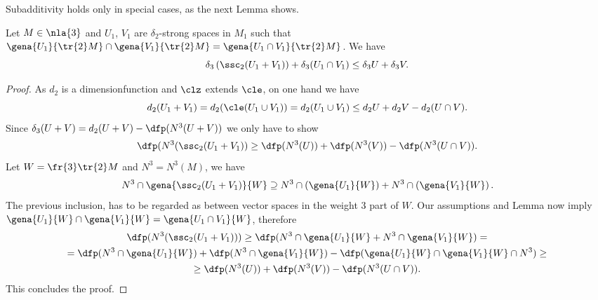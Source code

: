 Subadditivity holds only in special cases, as the next Lemma shows.
\begin{lem}\label{presubatre}
Let $M\in\nla{3}$ and $U_{1}$, $V_{1}$ are $\delta_{2}$-strong spaces in $M_{1}$ such that
$\gena{U_{1}}{\tr{2}M}\cap\gena{V_{1}}{\tr{2}M}=\gena{U_{1}\cap V_{1}}{\tr{2}M}$.
We have
$$\delta_3\left(\ssc_{2}(U_{1}+V_{1})\right)+\delta_{3}(U_{1}\cap V_{1})\leq\delta_{3}U+\delta_{3}V.$$
\end{lem}
\begin{proof}
As $d_{2}$ is a dimensionfunction and $\clz$ extends $\cle$, on one hand we have
$$d_{2}(U_{1}+V_{1})=d_{2}(\cle(U_{1}\cup V_{1}))=
d_{2}(U_{1}\cup V_{1})\leq
d_{2}U+d_{2}V-d_{2}(U\cap V).$$
Since $\delta_{3}(U+V)=d_{2}(U+V)-\dfp(N^{3}(U+V))$ we only have to show
$$\dfp(N^{3}(\ssc_{2}(U_{1}+V_{1}))\geq\dfp(N^{3}(U))+\dfp(N^{3}(V))-\dfp(N^{3}(U\cap V)).$$
Let $W=\fr{3}\tr{2}M$ and $N^{3}=N^{3}(M)$, we have
$$
N^{3}\cap\gena{\ssc_{2}(U_{1}+V_{1})}{W}\supseteq
N^{3}\cap\left(\gena{U_{1}}{W}\right)+N^{3}\cap\left(\gena{V_{1}}{W}\right).
$$
The previous inclusion, has to be regarded as
between vector spaces in the weight $3$ part of $W$.
Our assumptions and Lemma  now imply
$\gena{U_{1}}{W}\cap\gena{V_{1}}{W}=\gena{U_{1}\cap V_{1}}{W}$, therefore
\begin{multline*}
\dfp(N^{3}(\ssc_{2}(U_{1}+V_{1})))\geq\dfp(N^{3}\cap\gena{U_{1}}{W}+N^{3}\cap\gena{V_{1}}{W})=\\
=\dfp(N^{3}\cap\gena{U_{1}}{W})+\dfp(N^{3}\cap\gena{V_{1}}{W})-\dfp(\gena{U_{1}}{W}\cap\gena{V_{1}}{W}
\cap N^{3})\geq\\
\geq\dfp(N^{3}(U))+\dfp(N^{3}(V))-\dfp(N^{3}(U\cap V)).
\end{multline*}
This concludes the proof.
\end{proof}
